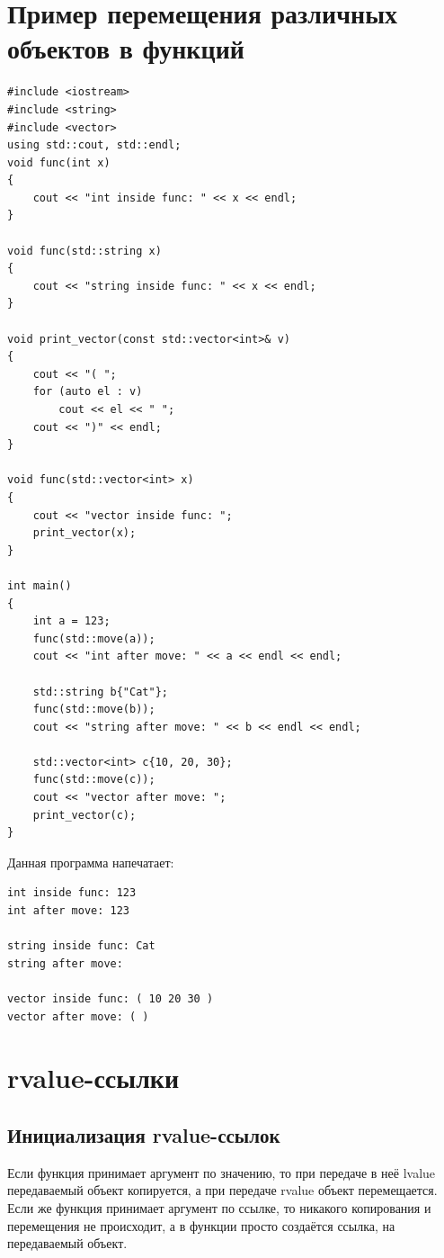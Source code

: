 \documentclass{article}
\begin{document}
\section*{Пример перемещения различных объектов в функций}
\begin{lstlisting}
#include <iostream>
#include <string>
#include <vector>
using std::cout, std::endl;
void func(int x)
{
    cout << "int inside func: " << x << endl;    
}

void func(std::string x)
{
    cout << "string inside func: " << x << endl;    
}

void print_vector(const std::vector<int>& v)
{
    cout << "( ";
    for (auto el : v)
        cout << el << " ";
    cout << ")" << endl;
}

void func(std::vector<int> x)
{
    cout << "vector inside func: "; 
    print_vector(x);   
}

int main()
{
    int a = 123;
    func(std::move(a));
    cout << "int after move: " << a << endl << endl;
    
    std::string b{"Cat"};
    func(std::move(b));
    cout << "string after move: " << b << endl << endl;
     
    std::vector<int> c{10, 20, 30};
    func(std::move(c)); 
    cout << "vector after move: ";
    print_vector(c);
}
\end{lstlisting}
Данная программа напечатает:
\begin{verbatim}
int inside func: 123
int after move: 123

string inside func: Cat
string after move:

vector inside func: ( 10 20 30 )
vector after move: ( )
\end{verbatim}




\section*{rvalue-ссылки}

\subsection*{Инициализация rvalue-ссылок}
Если функция принимает аргумент по значению, то при передаче в неё lvalue передаваемый объект копируется, а при передаче rvalue объект перемещается. Если же функция принимает аргумент по ссылке, то никакого копирования и перемещения не происходит, а в функции просто создаётся ссылка, на передаваемый объект. 
\end{document}
